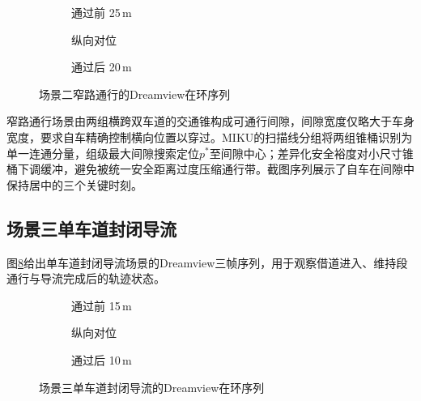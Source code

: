\begin{figure}[H]
\centering
\begin{subfigure}[b]{\textwidth}
  \centering
  
  \caption{通过前 25\,m}
  \label{fig:eng_scn02:a}
\end{subfigure}

\begin{subfigure}[b]{\textwidth}
  \centering
  
  \caption{纵向对位}
  \label{fig:eng_scn02:b}
\end{subfigure}

\begin{subfigure}[b]{\textwidth}
  \centering
  
  \caption{通过后 20\,m}
  \label{fig:eng_scn02:c}
\end{subfigure}
\caption{场景二窄路通行的Dreamview在环序列}
\label{fig:eng_scn02}
\end{figure}

窄路通行场景由两组横跨双车道的交通锥构成可通行间隙，间隙宽度仅略大于车身宽度，要求自车精确控制横向位置以穿过。MIKU的扫描线分组将两组锥桶识别为单一连通分量，组级最大间隙搜索定位$p^{*}$至间隙中心；差异化安全裕度对小尺寸锥桶下调缓冲，避免被统一安全距离过度压缩通行带。截图序列展示了自车在间隙中保持居中的三个关键时刻。

\subsection{场景三单车道封闭导流}

图\ref{fig:eng_scn03}给出单车道封闭导流场景的Dreamview三帧序列，用于观察借道进入、维持段通行与导流完成后的轨迹状态。

\begin{figure}[H]
\centering
\begin{subfigure}[b]{\textwidth}
  \centering
  
  \caption{通过前 15\,m}
  \label{fig:eng_scn03:a}
\end{subfigure}

\begin{subfigure}[b]{\textwidth}
  \centering
  
  \caption{纵向对位}
  \label{fig:eng_scn03:b}
\end{subfigure}

\begin{subfigure}[b]{\textwidth}
  \centering
  
  \caption{通过后 10\,m}
  \label{fig:eng_scn03:c}
\end{subfigure}
\caption{场景三单车道封闭导流的Dreamview在环序列}
\label{fig:eng_scn03}
\end{figure}

